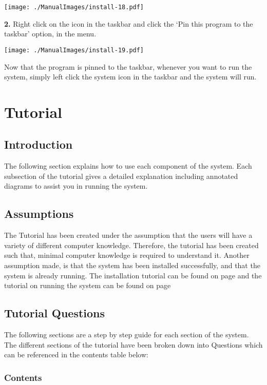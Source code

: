 \texttt{[image: ./ManualImages/install-18.pdf]}

\textbf{2.} Right click on the icon in the taskbar and click the `Pin this program to the taskbar' option, in the menu.

\texttt{[image: ./ManualImages/install-19.pdf]}

Now that the program is pinned to the taskbar, whenever you want to run the system, simply left click the system icon in the taskbar and the system will run.

\pagebreak

\section{Tutorial}

\subsection{Introduction}
The following section explains how to use each component of the system. Each subsection of the tutorial gives a detailed explanation including annotated diagrams to assist you in running the system.


\subsection{Assumptions}

The Tutorial has been created under the assumption that the users will have a variety of different computer knowledge. Therefore, the tutorial has been created such that, minimal computer knowledge is required to understand it. Another assumption made, is that the system has been installed successfully, and that the system is already running. The installation tutorial can be found on page \pageref{fig:System Installation} and the tutorial on running the system can be found on page \pageref{fig:Running the System}

\subsection{Tutorial Questions}
The following sections are a step by step guide for each section of the system. The different sections of the tutorial have been broken down into Questions which can be referenced in the contents table below:

\pagebreak
\subsubsection{Contents}

